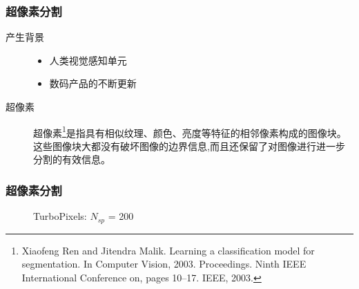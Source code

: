 \documentclass[notheorems,mathserif,table,compress]{beamer}  %
\begin{document}
\begin{frame}
\frametitle{超像素分割}
\begin{description}
\item[产生背景] 
\begin{itemize}
\item 人类视觉感知单元
\item 数码产品的不断更新
\end{itemize}
\end{description}

\begin{description}
\item[超像素] 超像素\footnote{Xiaofeng Ren and Jitendra Malik. Learning a classification model for segmentation. In Computer Vision, 2003. Proceedings. Ninth IEEE International Conference on, pages 10–17. IEEE, 2003.}是指具有相似纹理、颜色、亮度等特征的相邻像素构成的图像块。这些图像块大都没有破坏图像的边界信息,而且还保留了对图像进行进一步分割的有效信息。
\end{description}
\end{frame}


\begin{frame}
\frametitle{超像素分割}
\begin{figure}
  \centering 
  \caption{TurboPixels: $N_{sp}$ = 200}
  \label{fig: TurboPixels} %
\end{figure}
\end{frame}
\end{document}
